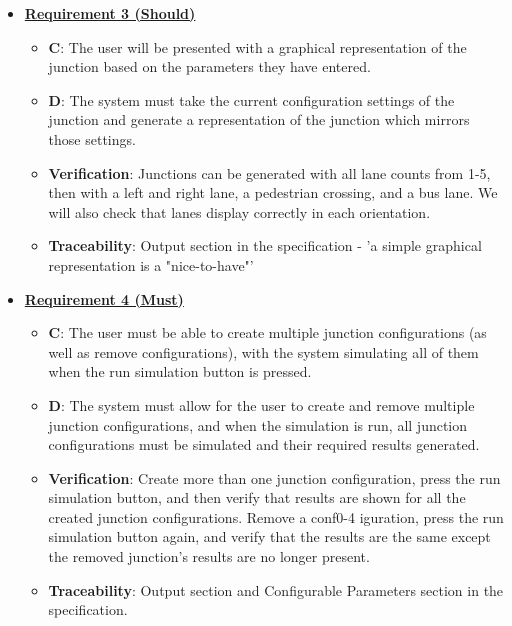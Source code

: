 \documentclass{article}
\begin{document}
\begin{itemize}

    \item \textbf{\underline{Requirement 3 (Should)}}
    \begin{itemize}
        \item \textbf{C}: The user will be presented with a graphical representation of the junction 
        based on the parameters they have entered.
        \item \textbf{D}: The system must take the current configuration settings of the junction and 
        generate a representation of the junction which mirrors those settings. 
        \item \textbf{Verification}: Junctions can be generated with all lane counts from 1-5, then 
        with a left and right lane, a pedestrian crossing, and a bus lane. We will also check that 
        lanes display correctly in each orientation.
        \item\textbf{Traceability}: Output section in the specification - 'a simple graphical 
        representation is a "nice-to-have"'
    \end{itemize}

    \item \textbf{\underline{Requirement 4 (Must)}}
    \begin{itemize}
        \item \textbf{C}: The user must be able to create multiple junction configurations (as 
        well as remove configurations), with the system simulating all of them when the run 
        simulation button is pressed.
        \item \textbf{D}: The system must allow for the user to create and remove multiple 
        junction configurations, and when the simulation is run, all junction configurations 
        must be simulated and their required results generated.
        \item \textbf{Verification}: Create more than one junction configuration, press the run 
        simulation button, and then verify that results are shown for all the created junction 
        configurations. Remove a conf0-4 iguration, press the run simulation button again, and verify 
        that the results are the same except the removed junction's results are no longer present.
        \item\textbf{Traceability}: Output section and Configurable Parameters section in the specification.
    \end{itemize}


\end{itemize}
\end{document}
